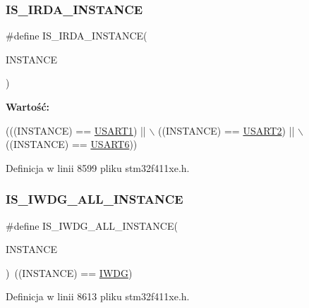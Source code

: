 \subsubsection{\texorpdfstring{I\+S\+\_\+\+I\+R\+D\+A\+\_\+\+I\+N\+S\+T\+A\+N\+CE}{IS\_IRDA\_INSTANCE}}
{\footnotesize\ttfamily \#define I\+S\+\_\+\+I\+R\+D\+A\+\_\+\+I\+N\+S\+T\+A\+N\+CE(\begin{DoxyParamCaption}\item[{}]{I\+N\+S\+T\+A\+N\+CE }\end{DoxyParamCaption})}

{\bfseries Wartość\+:}
\begin{DoxyCode}
(((INSTANCE) == \hyperlink{group___peripheral__declaration_ga92871691058ff7ccffd7635930cb08da}{USART1}) || \(\backslash\)
                                    ((INSTANCE) == \hyperlink{group___peripheral__declaration_gaf114a9eab03ca08a6fb720e511595930}{USART2}) || \(\backslash\)
                                    ((INSTANCE) == \hyperlink{group___peripheral__declaration_ga2dab39a19ce3dd05fe360dcbb7b5dc84}{USART6}))
\end{DoxyCode}


Definicja w linii 8599 pliku stm32f411xe.\+h.

\mbox{\label{group___exported__macros_gad9ec4c52f0572ee67d043e006f1d5e39}} 
\subsubsection{\texorpdfstring{I\+S\+\_\+\+I\+W\+D\+G\+\_\+\+A\+L\+L\+\_\+\+I\+N\+S\+T\+A\+N\+CE}{IS\_IWDG\_ALL\_INSTANCE}}
{\footnotesize\ttfamily \#define I\+S\+\_\+\+I\+W\+D\+G\+\_\+\+A\+L\+L\+\_\+\+I\+N\+S\+T\+A\+N\+CE(\begin{DoxyParamCaption}\item[{}]{I\+N\+S\+T\+A\+N\+CE }\end{DoxyParamCaption})~((I\+N\+S\+T\+A\+N\+CE) == \hyperlink{group___peripheral__declaration_gad16b79dd94ee85d261d08a8ee94187e7}{I\+W\+DG})}



Definicja w linii 8613 pliku stm32f411xe.\+h.

